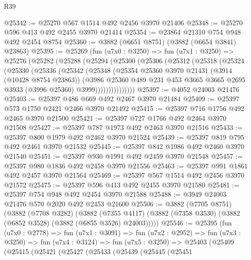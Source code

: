 \begin{lexlean}{R39}
\begin{coremodule}
@25342 := @25270 @567 @1514 @492 @2456 @3970 @21406
@25348 := @25270 @596 @413 @492 @2455 @3970 @21414
@25354 := @23864 @21310 @754 @948 @492 @2454 @8754
@25360 := @3882 (@6651 @8751) (@3882 (@6654 @3841) @23863)
@25395 := @25269
    (fun (u7x0 : @3250) =>
    fun (u7x1 : @3250) =>
    @25276
      (@25282
        (@25288
          (@25294
            (@25300
              (@25306
                (@25312
                  (@25318
                    (@25324
                      (@25330
                        (@25336
                          (@25342
                            (@25348
                              (@25354
                                @25360
                                @3970
                                @21431
                                (@3914 (@10428 @8754 @23863))
                                (@3986
                                  @25360
                                  @489
                                  @231
                                  @453
                                  @3665
                                  @3665
                                  @2695
                                  @3933
                                  (@3996 @25360)
                                  @3999)))))))))))))))
@25397 := @4052 @24003 @21476
@25403 := @25397 @486 @669 @492 @2467 @3970 @21484
@25409 := @25397 @573 @1750 @2421 @2466 @3970 @21492
@25415 := @25397 @716 @1756 @492 @2465 @3970 @21500
@25421 := @25397 @727 @1766 @492 @2464 @3970 @21508
@25427 := @25397 @787 @1973 @492 @2463 @3970 @21516
@25433 := @25397 @800 @1979 @492 @2462 @3970 @21524
@25439 := @25397 @819 @795 @492 @2461 @3970 @21532
@25445 := @25397 @842 @1986 @492 @2460 @3970 @21540
@25451 := @25397 @930 @1991 @492 @2459 @3970 @21548
@25457 := @25397 @980 @1836 @492 @2458 @3970 @21556
@25463 := @25397 @991 @1861 @492 @2457 @3970 @21564
@25469 := @25397 @567 @1514 @492 @2456 @3970 @21572
@25475 := @25397 @596 @413 @492 @2455 @3970 @21580
@25481 := @25397 @754 @948 @492 @2454 @3970 @21588
@25488 := @3949 @24003 @21476 @570 @2020 @492 @2453 @21600
@25506 := @3882
    (@7705 @8751)
    (@3882
      (@7708 @3282)
      (@3882
        (@7355 @4117)
        (@3882 (@7358 @3530) (@3882 (@6852 @3528) (@3882 (@6855 @3526) @24003)))))
@25546 := @25395
    (fun (u7x0 : @2778) =>
    fun (u7x1 : @3091) =>
    fun (u7x2 : @2952) =>
    fun (u7x3 : @3250) =>
    fun (u7x4 : @3124) =>
    fun (u7x5 : @3250) =>
    @25403
      (@25409
        (@25415
          (@25421
            (@25427
              (@25433
                (@25439
                  (@25445
                    (@25451

\end{coremodule}
\end{lexlean}
